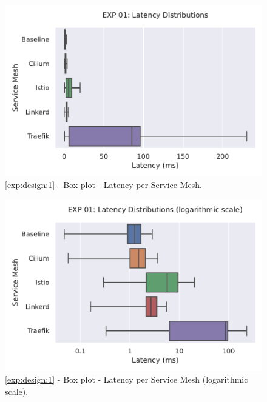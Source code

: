 \begin{figure}[h]
    \centering
    
    \includegraphics[width=\linewidth]{5_experimental_evaluation/figures/exp_01-latency-boxplot.pdf}

    \caption{\ref{exp:design:1} - Box plot - Latency per Service Mesh.}
    
    \label{fig:appendix:exp:result:01:latency:boxplot}
\end{figure}


\begin{figure}[h]
    \centering
    
    \includegraphics[width=\linewidth]{5_experimental_evaluation/figures/exp_01-latency-boxplot-log.pdf}

    \caption{\ref{exp:design:1} - Box plot - Latency per Service Mesh (logarithmic scale).}
    
    \label{fig:appendix:exp:result:01:latency:boxplot-log}
\end{figure}

